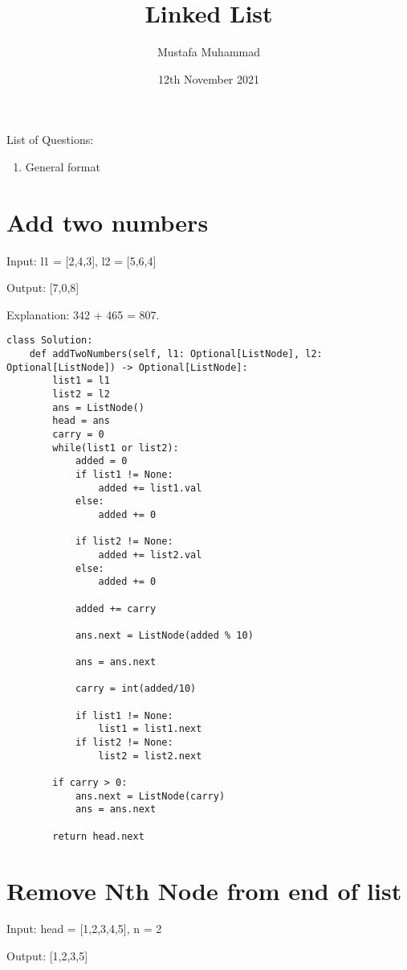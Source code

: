 \documentclass[24pt, a4]{article}
\title{Linked List}
\author{Mustafa Muhammad}
\date{12th November 2021}
\begin{document}
\maketitle


List of Questions:
\begin{enumerate}
    \item{General format}
\end{enumerate}

\section{Add two numbers}
Input: l1 = [2,4,3], l2 = [5,6,4]

Output: [7,0,8]

Explanation: 342 + 465 = 807.

\begin{lstlisting}
class Solution:
    def addTwoNumbers(self, l1: Optional[ListNode], l2: Optional[ListNode]) -> Optional[ListNode]:
        list1 = l1
        list2 = l2
        ans = ListNode()
        head = ans
        carry = 0
        while(list1 or list2):
            added = 0
            if list1 != None:
                added += list1.val
            else:
                added += 0
            
            if list2 != None:
                added += list2.val
            else:
                added += 0
                
            added += carry
            
            ans.next = ListNode(added % 10)
            
            ans = ans.next
            
            carry = int(added/10)
            
            if list1 != None:
                list1 = list1.next
            if list2 != None:
                list2 = list2.next
            
        if carry > 0:
            ans.next = ListNode(carry)
            ans = ans.next
            
        return head.next
\end{lstlisting}

\section{Remove Nth Node from end of list}
Input: head = [1,2,3,4,5], n = 2

Output: [1,2,3,5]
\end{document}

